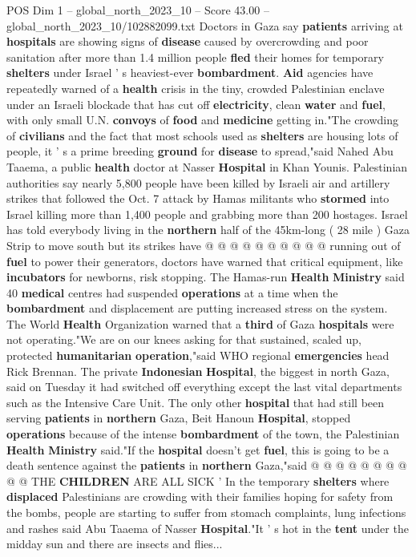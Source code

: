 \begin{textsample}{POS Dim 1 – global\_north\_2023\_10 – Score 43.00 – global\_north\_2023\_10/102882099.txt}  \label{ex:f1_pos_317}
Doctors in Gaza say \textbf{patients} arriving at \textbf{hospitals} are showing signs of \textbf{disease} caused by overcrowding and poor sanitation after more than 1.4 million people \textbf{fled} their homes for temporary \textbf{shelters} under Israel ' s heaviest-ever \textbf{bombardment}. \textbf{Aid} agencies have repeatedly warned of a \textbf{health} crisis in the tiny, crowded Palestinian enclave under an Israeli blockade that has cut off \textbf{electricity}, clean \textbf{water} and \textbf{fuel}, with only small U.N. \textbf{convoys} of \textbf{food} and \textbf{medicine} getting in."The crowding of \textbf{civilians} and the fact that most schools used as \textbf{shelters} are housing lots of people, it ' s a prime breeding \textbf{ground} for \textbf{disease} to spread,"said Nahed Abu Taaema, a public \textbf{health} doctor at Nasser \textbf{Hospital} in Khan Younis.
Palestinian authorities say nearly 5,800 people have been killed by Israeli air and artillery strikes that followed the Oct. 7 attack by Hamas militants who \textbf{stormed} into Israel killing more than 1,400 people and grabbing more than 200 hostages.
Israel has told everybody living in the \textbf{northern} half of the 45km-long ( 28 mile ) Gaza Strip to move south but its strikes have @ @ @ @ @ @ @ @ @ @ running out of \textbf{fuel} to power their generators, doctors have warned that critical equipment, like \textbf{incubators} for newborns, risk stopping.
The Hamas-run \textbf{Health} \textbf{Ministry} said 40 \textbf{medical} centres had suspended \textbf{operations} at a time when the \textbf{bombardment} and displacement are putting increased stress on the system.
The World \textbf{Health} Organization warned that a \textbf{third} of Gaza \textbf{hospitals} were not operating."We are on our knees asking for that sustained, scaled up, protected \textbf{humanitarian} \textbf{operation},"said WHO regional \textbf{emergencies} head Rick Brennan.
The private \textbf{Indonesian} \textbf{Hospital}, the biggest in north Gaza, said on Tuesday it had switched off everything except the last vital departments such as the Intensive Care Unit.
The only other \textbf{hospital} that had still been serving \textbf{patients} in \textbf{northern} Gaza, Beit Hanoun \textbf{Hospital}, stopped \textbf{operations} because of the intense \textbf{bombardment} of the town, the Palestinian \textbf{Health} \textbf{Ministry} said."If the \textbf{hospital} doesn't get \textbf{fuel}, this is going to be a death sentence against the \textbf{patients} in \textbf{northern} Gaza,"said @ @ @ @ @ @ @ @ @ @ THE \textbf{CHILDREN} ARE ALL SICK ' In the temporary \textbf{shelters} where \textbf{displaced} Palestinians are crowding with their families hoping for safety from the bombs, people are starting to suffer from stomach complaints, lung infections and rashes said Abu Taaema of Nasser \textbf{Hospital}."It ' s hot in the \textbf{tent} under the midday sun and there are insects and flies...

\end{textsample}

